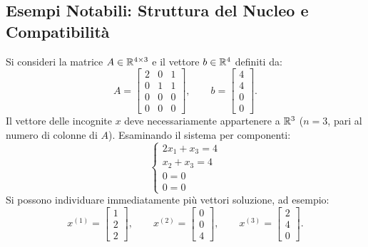 \subsection{Esempi Notabili: Struttura del Nucleo e Compatibilit\`a}

\begin{example}
\label{ex:infinite-soluzioni}
Si consideri la matrice $A \in \mathbb{R}^{4 \times 3}$ e il vettore $b \in \mathbb{R}^4$ definiti da:
\begin{equation}
    A = \begin{bmatrix}
        2 & 0 & 1 \\
        0 & 1 & 1 \\
        0 & 0 & 0 \\
        0 & 0 & 0
    \end{bmatrix}, \qquad
    b = \begin{bmatrix}
        4 \\ 4 \\ 0 \\ 0
    \end{bmatrix}.
\end{equation}
Il vettore delle incognite $x$ deve necessariamente appartenere a $\mathbb{R}^3$ ($n = 3$, pari al numero di colonne di $A$). Esaminando il sistema per componenti:
\begin{equation}
    \begin{cases}
        2x_1 + x_3 = 4 \\
        x_2 + x_3 = 4 \\
        0 = 0 \\
        0 = 0
    \end{cases}
\end{equation}
Si possono individuare immediatamente pi\`u vettori soluzione, ad esempio:
\begin{equation}
    x^{(1)} = \begin{bmatrix} 1 \\ 2 \\ 2 \end{bmatrix}, \qquad
    x^{(2)} = \begin{bmatrix} 0 \\ 0 \\ 4 \end{bmatrix}, \qquad
    x^{(3)} = \begin{bmatrix} 2 \\ 4 \\ 0 \end{bmatrix}.
\end{equation}

\end{example}

